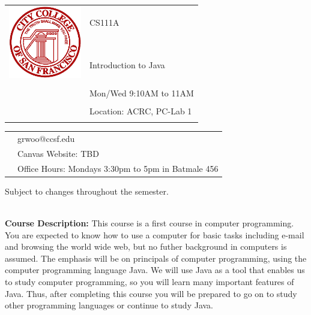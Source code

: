 \documentclass[11pt]{article}
\begin{document}
\begin{tabular}{ l l }
  \multirow{3}{*}{\includegraphics[height=1.25in,width=1.25in]{logo_ccsf.png}} & \LARGE CS111A \\\\
                                                                             & \LARGE Introduction to Java \\\\
  & \LARGE Mon/Wed 9:10AM to 11AM \\\\
  & \LARGE Location: ACRC, PC-Lab 1\\\\
\end{tabular}
\vspace{10mm}

\begin{tabular}{ l l }
  & \large grwoo@ccsf.edu \\
  & \large Canvas Website: TBD \\
  & \large Office Hours:  Mondays 3:30pm to 5pm in Batmale 456\\
\end{tabular}
\vspace{5mm}
\begin{center} Subject to changes throughout the semester.\\
\end{center}

\textbf {\large \\ Course Description:} This course is a first course in computer programming. You are expected to know how to use a computer for basic tasks including e-mail and browsing the world wide web, but no futher background in computers is assumed. The emphasis will be on principals of computer programming, using the computer programming language Java. We will use Java as a tool that enables us to study computer programming, so you will learn many important features of Java. Thus, after completing this course you will be prepared to go on to study other programming languages or continue to study Java.\\
\end{document}
